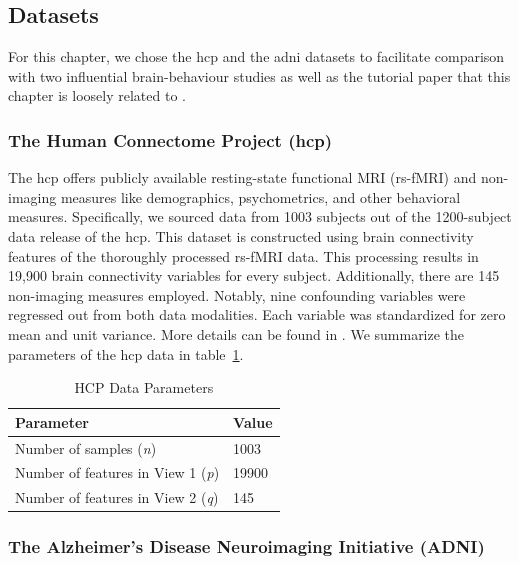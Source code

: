 \subsection{Datasets}\label{subsec:datasets}

For this chapter, we chose the \acrshort{hcp} and the \acrshort{adni} datasets to facilitate comparison with two influential brain-behaviour studies \citep{smith2015positive, monteiro2016multiple} as well as the tutorial paper that this chapter is loosely related to \citep{mihalik2022canonical}.

\subsubsection{The Human Connectome Project (\acrshort{hcp})}

The \acrshort{hcp} offers publicly available resting-state functional MRI (rs-fMRI) and non-imaging measures like demographics, psychometrics, and other behavioral measures.
Specifically, we sourced data from 1003 subjects out of the 1200-subject data release of the \acrshort{hcp}.
This dataset is constructed using brain connectivity features of the thoroughly processed rs-fMRI data.
This processing results in 19,900 brain connectivity variables for every subject.
Additionally, there are 145 non-imaging measures employed.
Notably, nine confounding variables were regressed out from both data modalities.
Each variable was standardized for zero mean and unit variance.
More details can be found in \cite{smith2015positive, mihalik2022canonical}.
We summarize the parameters of the \acrshort{hcp} data in table~\ref{tab:hcp-parameters}.

\begin{table}
    \centering
    \caption{HCP Data Parameters}
    \begin{tabular}{| l | l |}
        \hline
        \textbf{Parameter}                        & \textbf{Value} \\
        \hline
        Number of samples (\textit{n})            & 1003           \\
        Number of features in View 1 (\textit{p}) & 19900          \\
        Number of features in View 2 (\textit{q}) & 145            \\
        \hline
    \end{tabular}\label{tab:hcp-parameters}
\end{table}

\subsubsection{The Alzheimer's Disease Neuroimaging Initiative (ADNI)}

